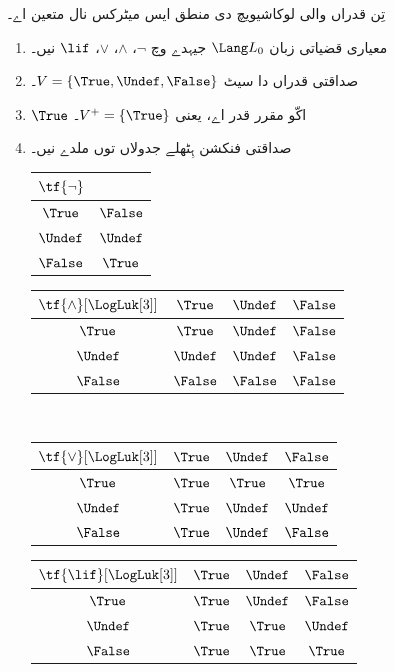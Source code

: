 \documentclass[../../../include/open-logic-section]{subfiles}
\begin{document}
\begin{defn}
تِن قدراں والی لوکاشیویچ دی منطق ایس میٹرکس نال متعین اے۔
\begin{enumerate}
  \item معیاری قضیاتی زبان $\Lang L_0$ جیہدے وچ
  $\lnot$، $\land$، $\lor$، $\lif$ نیں۔
  \item صداقتی قدراں دا سیٹ $V = \{\True, \Undef, \False\}$۔
  \item $\True$ اکّو مقرر قدر اے، یعنی $V^+ = \{\True\}$۔
  \item صداقتی فنکشن ہِٹھلے جدولاں توں ملدے نیں۔
  \begin{center}
    \begin{tabular}{c|c} 
      $\tf{\lnot}$ & \\ 
      \hline  
      $\True$ & $\False$ \\ 
      $\Undef$ & $\Undef$ \\
      $\False$ & $\True$ 
    \end{tabular}
    \quad
    \begin{tabular}{c|ccc} 
      $\tf{\land}[\LogLuk[3]]$ & $\True$ & $\Undef$ & $\False$ \\ 
      \hline 
      $\True$ & $\True$ & $\Undef$ & $\False$ \\ 
      $\Undef$ & $\Undef$ & $\Undef$ & $\False$\\ 
      $\False$ & $\False$ & $\False$ & $\False$ 
    \end{tabular}
    \\[2ex]
    \begin{tabular}{c|ccc} 
      $\tf{\lor}[\LogLuk[3]]$ & $\True$ & $\Undef$ & $\False$ \\ 
      \hline 
      $\True$ & $\True$ & $\True$ & $\True$ \\ 
      $\Undef$ & $\True$ & $\Undef$ & $\Undef$ \\
      $\False$ & $\True$ & $\Undef$ & $\False$ 
    \end{tabular}
    \quad
    \begin{tabular}{c|ccc} 
      $\tf{\lif}[\LogLuk[3]]$ & $\True$ & $\Undef$ & $\False$ \\ 
      \hline 
      $\True$ & $\True$ & $\Undef$ & $\False$ \\ 
      $\Undef$ & $\True$ & $\True$ & $\Undef$  \\ 
      $\False$ & $\True$ & $\True$ & $\True$ 
    \end{tabular}
  \end{center}
\end{enumerate}
\end{defn}
\end{document}
